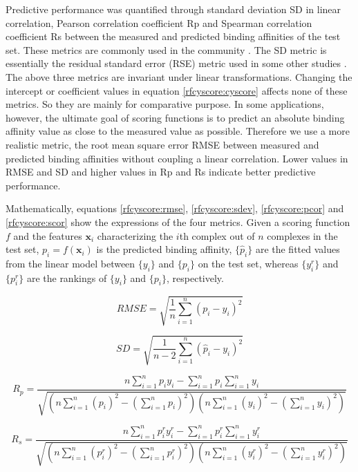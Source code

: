 Predictive performance was quantified through standard deviation SD in linear correlation, Pearson correlation coefficient Rp and Spearman correlation coefficient Rs between the measured and predicted binding affinities of the test set. These metrics are commonly used in the community \citep{1313}. The SD metric is essentially the residual standard error (RSE) metric used in some other studies \citep{963}. The above three metrics are invariant under linear transformations. Changing the intercept or coefficient values in equation \eqref{rfcyscore:cyscore} affects none of these metrics. So they are mainly for comparative purpose. In some applications, however, the ultimate goal of scoring functions is to predict an absolute binding affinity value as close to the measured value as possible. Therefore we use a more realistic metric, the root mean square error RMSE between measured and predicted binding affinities without coupling a linear correlation. Lower values in RMSE and SD and higher values in Rp and Rs indicate better predictive performance.

Mathematically, equations \eqref{rfcyscore:rmse}, \eqref{rfcyscore:sdev}, \eqref{rfcyscore:pcor} and \eqref{rfcyscore:scor} show the expressions of the four metrics. Given a scoring function $f$ and the features $\mathbf{x}_i$ characterizing the $i$th complex out of $n$ complexes in the test set, $p_i=f(\mathbf{x}_i)$ is the predicted binding affinity, $\{\hat{p}_i\}$ are the fitted values from the linear model between $\{y_i\}$ and $\{p_i\}$ on the test set, whereas $\{y^r_i\}$ and $\{p^r_i\}$ are the rankings of $\{y_i\}$ and $\{p_i\}$, respectively.

\begin{equation}
RMSE=\sqrt{\frac{1}{n}\sum_{i=1}^n(p_i-y_i)^2}
\label{rfcyscore:rmse}
\end{equation}

\begin{equation}
SD=\sqrt{\frac{1}{n-2}\sum_{i=1}^n(\hat{p}_i-y_i)^2}
\label{rfcyscore:sdev}
\end{equation}

\begin{equation}
R_p=\frac{n\sum_{i=1}^np_iy_i-\sum_{i=1}^np_i\sum_{i=1}^ny_i}{\sqrt{(n\sum_{i=1}^n(p_i)^2-(\sum_{i=1}^np_i)^2)(n\sum_{i=1}^n(y_i)^2-(\sum_{i=1}^ny_i)^2)}}
\label{rfcyscore:pcor}
\end{equation}

\begin{equation}
R_s=\frac{n\sum_{i=1}^np^r_iy^r_i-\sum_{i=1}^np^r_i\sum_{i=1}^ny^r_i}{\sqrt{(n\sum_{i=1}^n(p^r_i)^2-(\sum_{i=1}^np^r_i)^2)(n\sum_{i=1}^n(y^r_i)^2-(\sum_{i=1}^ny^r_i)^2)}}
\label{rfcyscore:scor}
\end{equation}

